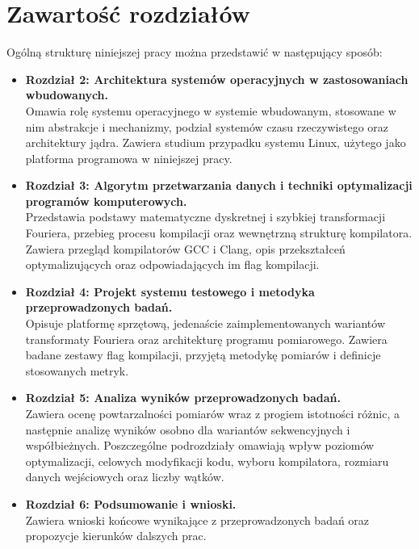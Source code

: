 \section{Zawartość rozdziałów}
Ogólną strukturę niniejszej pracy można przedstawić w następujący sposób:
\begin{itemize}

    \item \textbf{Rozdział 2: Architektura systemów operacyjnych w zastosowaniach wbudowanych.}
    \\Omawia rolę systemu operacyjnego w systemie wbudowanym, stosowane w nim abstrakcje i mechanizmy, podział systemów czasu rzeczywistego oraz architektury jądra. Zawiera studium przypadku systemu Linux, użytego jako platforma programowa w niniejszej pracy.

    \item \textbf{Rozdział 3: Algorytm przetwarzania danych i techniki optymalizacji programów komputerowych.}
    \\Przedstawia podstawy matematyczne dyskretnej i szybkiej transformacji Fouriera, przebieg procesu kompilacji oraz wewnętrzną strukturę kompilatora. Zawiera przegląd kompilatorów GCC i Clang, opis przekształceń optymalizujących oraz odpowiadających im flag kompilacji.

    \item \textbf{Rozdział 4: Projekt systemu testowego i metodyka przeprowadzonych badań.}
    \\Opisuje platformę sprzętową, jedenaście zaimplementowanych wariantów transformaty Fouriera oraz architekturę programu pomiarowego. Zawiera badane zestawy flag kompilacji, przyjętą metodykę pomiarów i definicje stosowanych metryk.

    \item \textbf{Rozdział 5: Analiza wyników przeprowadzonych badań.}
    \\Zawiera ocenę powtarzalności pomiarów wraz z progiem istotności różnic, a następnie analizę wyników osobno dla wariantów sekwencyjnych i współbieżnych. Poszczególne podrozdziały omawiają wpływ poziomów optymalizacji, celowych modyfikacji kodu, wyboru kompilatora, rozmiaru danych wejściowych oraz liczby wątków.

    \item \textbf{Rozdział 6: Podsumowanie i wnioski.}
    \\Zawiera wnioski końcowe wynikające z przeprowadzonych badań oraz propozycje kierunków dalszych prac.
\end{itemize}
